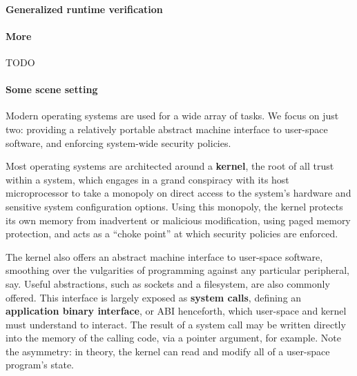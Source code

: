 \documentclass[sigplan, review]{acmart}
\newcommand{\deffont}[1]{\textbf{#1}}
\begin{document}

\paragraph{Generalized runtime verification}


\paragraph{More}

TODO



\iffalse

\paragraph{Some scene setting}

Modern operating systems are used for a wide array of tasks.
We focus on just two: providing a relatively portable abstract machine interface to user-space software, and enforcing system-wide security policies.

Most operating systems are architected around a \deffont{kernel}, the root of all trust within a system, which engages in a grand conspiracy with its host microprocessor to take a monopoly on direct access to the system's hardware and sensitive system configuration options.
Using this monopoly, the kernel protects its own memory from inadvertent or malicious modification, using paged memory protection, and acts as a ``choke point'' at which security policies are enforced.


The kernel also offers an abstract machine interface to user-space software, smoothing over the vulgarities of programming against any particular peripheral, say.
Useful abstractions, such as sockets and a filesystem, are also commonly offered.
This interface is largely exposed as \deffont{system calls}, defining an \deffont{application binary interface}, or ABI henceforth, which user-space and kernel must understand to interact.
The result of a system call may be written directly into the memory of the calling code, via a pointer argument, for example.
Note the asymmetry: in theory, the kernel can read and modify all of a user-space program's state.
\end{document}
